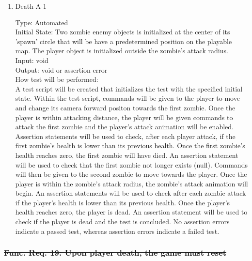 \documentclass[12pt, titlepage]{article}
\DeclareRobustCommand{\hsout}[1]{\texorpdfstring{\sout{#1}}{#1}}
\newcounter{ftnum}
\begin{document}
\begin{enumerate}

\item{Death-A-1\\}  \label{F18-1}

Type: Automated \\
					
Initial State: Two zombie enemy objects is initialized at the center of its 'spawn' circle that will be have a predetermined position on the playable map. The player object is initialized outside the zombie's attack radius.\\
					
Input: void \\
					
Output: void or assertion error \\
					
How test will be performed:\\  A test script will be created that initializes the test with the specified initial state. Within the test script, commands will be given to the player to move and change its camera forward positon towards the first zombie. Once the player is within attacking distance, the player will be given commands to attack the first zombie and the player's attack animation will be enabled. Assertion statements will be used to check, after each player attack, if the first zombie's health is lower than its previous health. Once the first zombie's health reaches zero, the first zombie will have died. An assertion statement will be used to check that the first zombie not longer exists (null). Commands will then be given to the second zombie to move towards the player. Once the player is within the zombie's attack radius, the zombie's attack animation will begin.  An assertion statements will be used to check after each zombie attack if the player's health is lower than its previous health. Once the player's health reaches zero, the player is dead. An assertion statement will be used to check if the player is dead and the test is concluded. No assertion errors indicate a passed test, whereas assertion errors indicate a failed test.\\

\end{enumerate}

\subsubsection{\hsout{Func. Req. 19: Upon player death, the game must reset}} 
\end{document}
